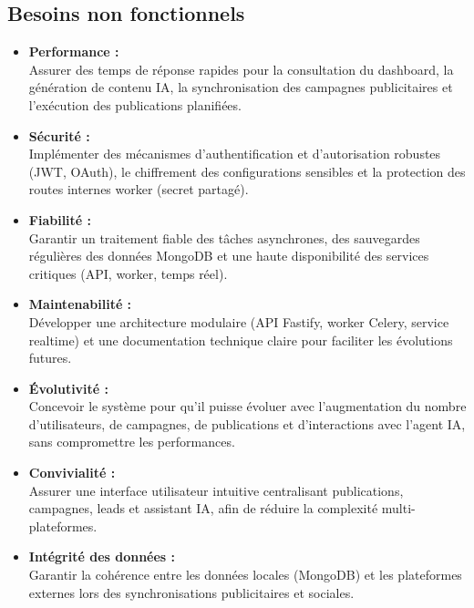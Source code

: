\documentclass[12pt,a4paper]{report}
\numberwithin{figure}{chapter}
\numberwithin{table}{chapter}
\begin{document}
\subsection{Besoins non fonctionnels}

\begin{itemize}[leftmargin=2em,itemsep=8pt]

\item[$\checkmark$] \textbf{Performance :} \\
Assurer des temps de réponse rapides pour la consultation du dashboard, la génération de contenu IA, la synchronisation des campagnes publicitaires et l’exécution des publications planifiées.

\item[$\checkmark$] \textbf{Sécurité :} \\
Implémenter des mécanismes d’authentification et d’autorisation robustes (JWT, OAuth), le chiffrement des configurations sensibles et la protection des routes internes worker (secret partagé).

\item[$\checkmark$] \textbf{Fiabilité :} \\
Garantir un traitement fiable des tâches asynchrones, des sauvegardes régulières des données MongoDB et une haute disponibilité des services critiques (API, worker, temps réel).

\item[$\checkmark$] \textbf{Maintenabilité :} \\
Développer une architecture modulaire (API Fastify, worker Celery, service realtime) et une documentation technique claire pour faciliter les évolutions futures.

\item[$\checkmark$] \textbf{Évolutivité :} \\
Concevoir le système pour qu’il puisse évoluer avec l’augmentation du nombre d’utilisateurs, de campagnes, de publications et d’interactions avec l’agent IA, sans compromettre les performances.

\item[$\checkmark$] \textbf{Convivialité :} \\
Assurer une interface utilisateur intuitive centralisant publications, campagnes, leads et assistant IA, afin de réduire la complexité multi-plateformes.

\item[$\checkmark$] \textbf{Intégrité des données :} \\
Garantir la cohérence entre les données locales (MongoDB) et les plateformes externes lors des synchronisations publicitaires et sociales.

\end{itemize}
\end{document}
